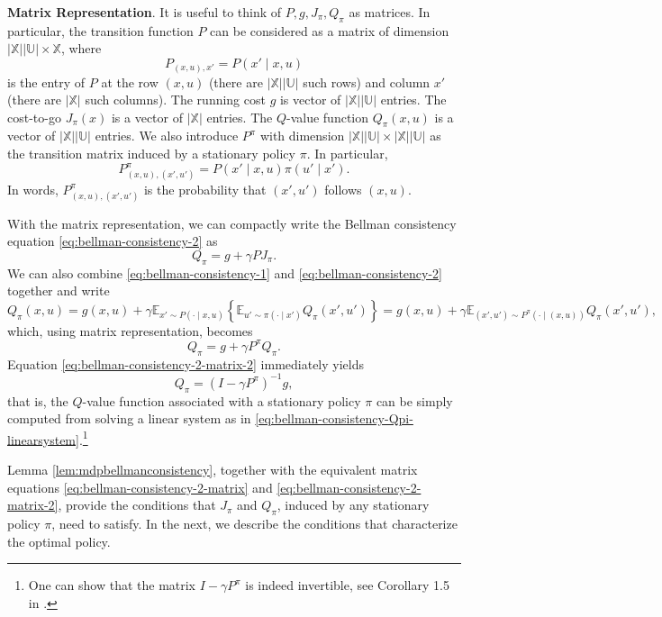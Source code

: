 \documentclass[
]{book}
\theoremstyle{definition}
\theoremstyle{definition}
\theoremstyle{definition}
\theoremstyle{definition}
\theoremstyle{remark}
\begin{document}
\textbf{Matrix Representation}. It is useful to think of \(P,g,J_\pi,Q_\pi\) as matrices. In particular, the transition function \(P\) can be considered as a matrix of dimension \(|\mathbb{X}||\mathbb{U}| \times \mathbb{X}\), where
\[
P_{(x,u),x'} = P(x' \mid x,u)
\]
is the entry of \(P\) at the row \((x,u)\) (there are \(|\mathbb{X}||\mathbb{U}|\) such rows) and column \(x'\) (there are \(|\mathbb{X}|\) such columns). The running cost \(g\) is vector of \(|\mathbb{X}||\mathbb{U}|\) entries. The cost-to-go \(J_\pi(x)\) is a vector of \(|\mathbb{X}|\) entries. The \(Q\)-value function \(Q_\pi(x,u)\) is a vector of \(|\mathbb{X}||\mathbb{U}|\) entries. We also introduce \(P^{\pi}\) with dimension \(|\mathbb{X}||\mathbb{U}| \times |\mathbb{X}||\mathbb{U}|\) as the transition matrix induced by a stationary policy \(\pi\). In particular,
\[
P^\pi_{(x,u),(x',u')} = P(x' \mid x,u) \pi(u'\mid x').
\]
In words, \(P^\pi_{(x,u),(x',u')}\) is the probability that \((x',u')\) follows \((x,u)\).

With the matrix representation, we can compactly write the Bellman consistency equation \eqref{eq:bellman-consistency-2} as
\begin{equation}
Q_\pi = g + \gamma P J_\pi.
\label{eq:bellman-consistency-2-matrix}
\end{equation}
We can also combine \eqref{eq:bellman-consistency-1} and \eqref{eq:bellman-consistency-2} together and write
\[
Q_\pi(x,u) = g(x,u) + \gamma \mathbb{E}_{x' \sim P(\cdot \mid x,u)} \left\{ \mathbb{E}_{u' \sim \pi(\cdot \mid x')} Q_\pi(x',u') \right\} = g(x,u) + \gamma \mathbb{E}_{(x',u') \sim P^\pi(\cdot \mid (x,u))} Q_\pi(x',u'),
\]
which, using matrix representation, becomes
\begin{equation}
Q_\pi = g + \gamma P^\pi Q_\pi.
\label{eq:bellman-consistency-2-matrix-2}
\end{equation}
Equation \eqref{eq:bellman-consistency-2-matrix-2} immediately yields
\begin{equation}
Q_\pi = (I - \gamma P^\pi)^{-1} g,
\label{eq:bellman-consistency-Qpi-linearsystem}
\end{equation}
that is, the \(Q\)-value function associated with a stationary policy \(\pi\) can be simply computed from solving a linear system as in \eqref{eq:bellman-consistency-Qpi-linearsystem}.\footnote{One can show that the matrix \(I - \gamma P^\pi\) is indeed invertible, see Corollary 1.5 in \citep{agarwal22book-reinforcement}.}

Lemma \ref{lem:mdpbellmanconsistency}, together with the equivalent matrix equations \eqref{eq:bellman-consistency-2-matrix} and \eqref{eq:bellman-consistency-2-matrix-2}, provide the conditions that \(J_\pi\) and \(Q_\pi\), induced by any stationary policy \(\pi\), need to satisfy. In the next, we describe the conditions that characterize the optimal policy.
\end{document}
